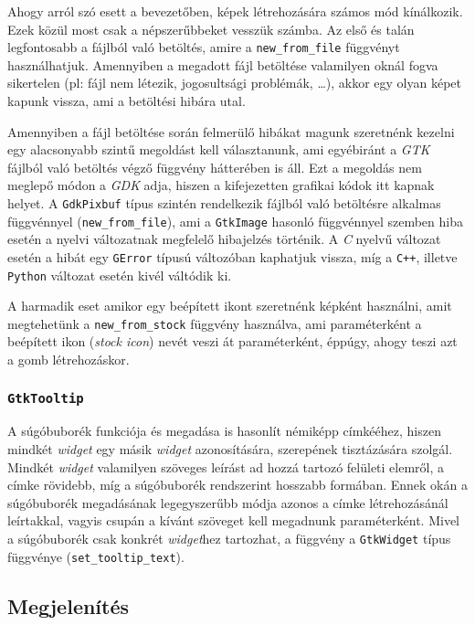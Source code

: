 Ahogy arról szó esett a bevezetőben, képek létrehozására számos mód kínálkozik. Ezek közül most csak a népszerűbbeket vesszük számba. Az első és talán legfontosabb a fájlból való betöltés, amire a \texttt{new\_from\_file} függvényt használhatjuk. Amennyiben a megadott fájl betöltése valamilyen oknál fogva sikertelen (pl: fájl nem létezik, jogosultsági problémák, \dots ), akkor egy olyan képet kapunk vissza, ami a betöltési hibára utal.

Amennyiben a fájl betöltése során felmerülő hibákat magunk szeretnénk kezelni egy alacsonyabb szintű megoldást kell választanunk, ami egyébiránt a \textit{GTK} fájlból való betöltés végző függvény hátterében is áll. Ezt a megoldás nem meglepő módon a \textit{GDK} adja, hiszen a kifejezetten grafikai kódok itt kapnak helyet. A \texttt{GdkPixbuf} típus szintén rendelkezik fájlból való betöltésre alkalmas függvénnyel (\texttt{new\_from\_file}), ami a \texttt{GtkImage} hasonló függvénnyel szemben hiba esetén a nyelvi változatnak megfelelő hibajelzés történik. A \textit{C} nyelvű változat esetén a hibát egy \texttt{GError} típusú változóban kaphatjuk vissza, míg a \texttt{C++}, illetve \texttt{Python} változat esetén kivél váltódik ki.


A harmadik eset amikor egy beépített ikont szeretnénk képként használni, amit megtehetünk a \texttt{new\_from\_stock} függvény használva, ami paraméterként a beépített ikon (\textit{stock icon}) nevét veszi át paraméterként, éppúgy, ahogy teszi azt a gomb létrehozáskor.

\subsubsection{\texttt{GtkTooltip}}

A súgóbuborék funkciója és megadása is hasonlít némiképp címkééhez, hiszen mindkét \textit{widget} egy másik \textit{widget} azonosítására, szerepének tisztázására szolgál. Mindkét \textit{widget} valamilyen szöveges leírást ad hozzá tartozó felületi elemről, a címke rövidebb, míg a súgóbuborék rendszerint hosszabb formában. Ennek okán a súgóbuborék megadásának legegyszerűbb módja azonos a címke létrehozásánál leírtakkal, vagyis csupán a kívánt szöveget kell megadnunk paraméterként. Mivel a súgóbuborék csak konkrét \textit{widget}hez tartozhat, a függvény a \texttt{GtkWidget} típus függvénye (\texttt{set\_tooltip\_text}).

\subsection{Megjelenítés}


